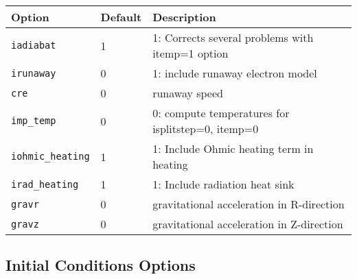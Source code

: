 \begin{tabular}{llp{4in}}
  \textbf{Option}&\textbf{Default}&\textbf{Description}\\
  \hline
  \texttt{iadiabat} & 1 & 1: Corrects several problems with itemp=1 option \\
  \texttt{irunaway} & 0 & 1:  include runaway electron model \\
  \texttt{cre} & 0 & runaway speed \\
  \texttt{imp\_temp} & 0 & 0: compute temperatures for isplitstep=0, itemp=0 \\
  \texttt{iohmic\_heating} & 1 & 1: Include Ohmic heating term in heating \\
  \texttt{irad\_heating} & 1 & 1: Include radiation heat sink \\
  \texttt{gravr} & 0 & gravitational acceleration in R-direction \\
  \texttt{gravz} & 0 & gravitational acceleration in Z-direction 
\end{tabular}

\subsection{Initial Conditions Options}

